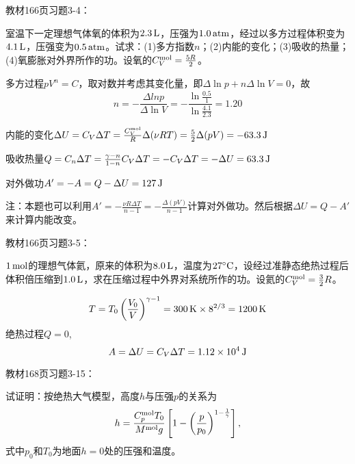 \documentclass[CJK]{beamer}
\begin{document}
\begin{frame}
  \chtitle{\proid (\stwo)}
  \bch
  教材166页习题3-4：

  室温下一定理想气体氧的体积为$2.3\,\mathrm{L}$，压强为$1.0\,\mathrm{atm}$，经过以多方过程体积变为$4.1\,\mathrm{L}$，压强变为$0.5\,\mathrm{atm}$。试求：(1)多方指数$n$；(2)内能的变化；(3)吸收的热量；(4)氧膨胀对外界所作的功。设氧的$C_V^{\rm mol}=\frac{5R}{2}$。
  \ech
\end{frame}

\begin{frame}
  \bch
      {\small
        \bitem
      \item{
        多方过程$pV^n = C$，取对数并考虑其变化量，即$\Delta \ln p + n \Delta \ln V = 0$，故
        $$n = - \frac{\Delta ln p}{\Delta \ln V} = -\frac{\ln\frac{0.5}{1}}{\ln\frac{4.1}{2.3}} = 1.20 $$}
      \item{内能的变化$\Delta U  = C_V\Delta T = \frac{C_V^{\rm mol}}{R}\Delta (\nu RT) = \frac{5}{2}\Delta(pV) = -63.3\,\mathrm{J}$}
      \item{吸收热量$Q = C_n \Delta T = \frac{\gamma-n}{1-n}C_V\Delta T = -C_V\Delta T = -\Delta U = 63.3\,\mathrm{J}$}
      \item{对外做功$A'=-A = Q-\Delta U = 127\,\mathrm{J}$}
        \eitem
        \skipline
        
注：本题也可以利用$A' = -\frac{\nu R \Delta T}{n-1} =-\frac{\Delta(pV)}{n-1}$计算对外做功。然后根据$\Delta U = Q-A'$来计算内能改变。        
  }
  \ech
\end{frame}

\begin{frame}
  \chtitle{\proid (\sone)}
  \bch
  教材166页习题3-5：

  $1\,\mathrm{mol}$的理想气体氦，原来的体积为$8.0\,\mathrm{L}$，温度为$27^\circ \mathrm{C}$，设经过准静态绝热过程后体积倍压缩到$1.0\,\mathrm{L}$，求在压缩过程中外界对系统所作的功。设氦的$C_V^{\rm mol} = \frac{3}{2}R$。
  \ech
\end{frame}

\begin{frame}
  \bch
  $$T=T_0\left(\frac{V_0}{V}\right)^{\gamma-1} = 300\,\mathrm{K}\times 8^{2/3} = 1200\,\mathrm{K} $$
  绝热过程$Q=0$,
  $$A = \Delta U =C_V\Delta T  = 1.12\times 10^4\,\mathrm{J}$$
  \ech
\end{frame}

\begin{frame}
  \chtitle{\proid (\sthree)}
  \bch
  教材168页习题3-15：

  试证明：按绝热大气模型，高度$h$与压强$p$的关系为
  $$ h = \frac{C_p^{\rm mol}T_0}{M^{\rm mol}g}\left[1-\left(\frac{p}{p_0}\right)^{1-\frac{1}{\gamma}}\right],$$
  式中$p_0$和$T_0$为地面$h=0$处的压强和温度。
  \ech
\end{frame}
\end{document}
